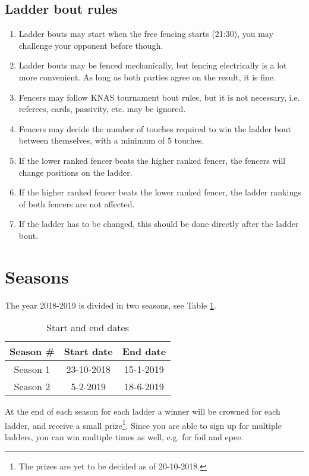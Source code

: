 \documentclass{article}
\begin{document}
\subsection{Ladder bout rules}
\begin{enumerate}
    \item Ladder bouts may start when the free fencing starts (21:30), you may challenge your opponent before though.
    \item Ladder bouts may be fenced mechanically, but fencing electrically is a lot more convenient. As long as both parties agree on the result, it is fine.
    \item Fencers may follow KNAS tournament bout rules, but it is not necessary, i.e. referees, cards, passivity, etc. may be ignored.
    \item Fencers may decide the number of touches required to win the ladder bout between themselves, with a minimum of 5 touches.
    \item If the lower ranked fencer beats the higher ranked fencer, the fencers will change positions on the ladder.
    \item If the higher ranked fencer beats the lower ranked fencer, the ladder rankings of both fencers are not affected.
    \item If the ladder has to be changed, this should be done directly after the ladder bout.
\end{enumerate}
\section{Seasons} \label{sec:Seasons}
The year 2018-2019 is divided in two seasons, see Table \ref{tab:dates}.
\begin{table}[ht]
    \centering
    \begin{tabular}{|c|c|c|}
        \hline
        Season \# & Start date & End date \\ \hline
        Season 1 & 23-10-2018 & 15-1-2019 \\ \hline
        Season 2 & 5-2-2019 & 18-6-2019 \\ \hline
    \end{tabular}
    \caption{Start and end dates}
    \label{tab:dates}
\end{table}
At the end of each season for each ladder a winner will be crowned for each ladder, and receive a small prize\footnote{The prizes are yet to be decided as of 20-10-2018.}. Since you are able to sign up for multiple ladders, you can win multiple times as well, e.g. for foil and epee.
\end{document}
